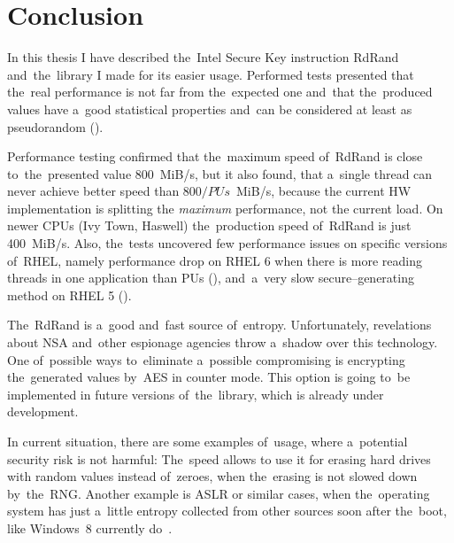 \chapter{Conclusion}
\par{
In this thesis I have described the~Intel Secure Key instruction RdRand and~the~library I made for its easier usage. Performed tests presented that the~real performance is not far from the~expected one and~that the~produced values have a~good statistical properties and~can be considered at least as pseudorandom ().
}

\par{
Performance testing confirmed that the~maximum speed of~RdRand is close to~the~presented value 800~MiB/s, but it also found, that a~single thread can never achieve better speed than
$800 / PUs$~MiB/s, because the current HW implementation is splitting the {\em maximum} performance, not the current load. On newer CPUs (Ivy Town, Haswell) the~production speed of~RdRand is just 400~MiB/s. Also, the~tests uncovered few performance issues on specific versions of~RHEL, namely performance drop on RHEL 6 when there is more reading threads in one application than PUs (), and~a~very slow secure--generating method on RHEL 5 ().
}

\par{
The~RdRand is a~good and~fast source of~entropy. Unfortunately, revelations about NSA and~other espionage agencies throw a~shadow over this technology. One of~possible ways to~eliminate a~possible compromising is encrypting the~generated values by~AES in counter mode. This option is going to~be implemented in future versions of~the~library, which is already under development.
}

\par{
In current situation, there are some examples of~usage, where a~potential security risk is not harmful: The~speed allows to use it for erasing hard drives with random values instead of~zeroes, when the~erasing is not slowed down by~the~RNG. Another example is ASLR or similar cases, when the~operating system has just a~little entropy collected from other sources soon after the~boot, like Windows~8 currently do~\cite{WindowsASLR}.
}

